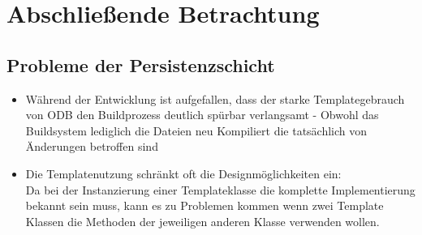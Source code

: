 \section{Abschließende Betrachtung}
\label{sec:abschluss}

\subsection{Probleme der Persistenzschicht}
\begin{itemize}
	\item Während der Entwicklung ist aufgefallen, dass der starke Templategebrauch von ODB den Buildprozess deutlich spürbar verlangsamt - Obwohl das Buildsystem lediglich die Dateien neu Kompiliert die tatsächlich von Änderungen betroffen sind\\
	\item Die Templatenutzung schränkt oft die Designmöglichkeiten ein:\\
		Da bei der Instanzierung einer Templateklasse die komplette Implementierung bekannt sein muss,
		kann es zu Problemen kommen wenn zwei Template Klassen die Methoden der jeweiligen anderen Klasse verwenden wollen.
\end{itemize}
